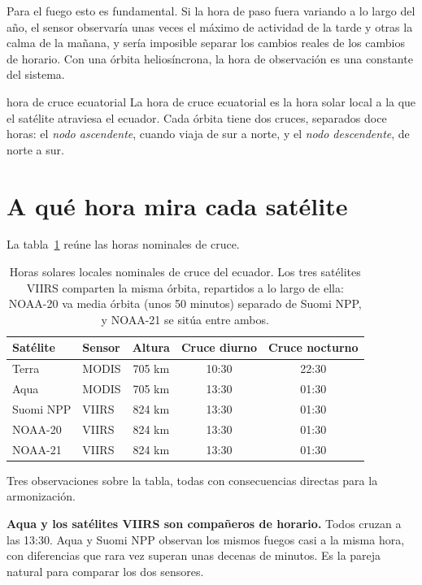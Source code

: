 Para el fuego esto es fundamental. Si la hora de paso fuera variando a lo largo del año, el
sensor observaría unas veces el máximo de actividad de la tarde y otras la calma de la mañana, y
sería imposible separar los cambios reales de los cambios de horario. Con una órbita
heliosíncrona, la hora de observación es una constante del sistema.

\begin{definicion}{hora de cruce ecuatorial}
La hora de cruce ecuatorial es la hora solar local a la que el satélite atraviesa el ecuador.
Cada órbita tiene dos cruces, separados doce horas: el \emph{nodo ascendente}, cuando viaja de
sur a norte, y el \emph{nodo descendente}, de norte a sur.
\end{definicion}

\section{A qué hora mira cada satélite}

La tabla~\ref{tab:horas} reúne las horas nominales de cruce.

\begin{table}[ht]
\centering
\begin{tabular}{llccc}
\toprule
Satélite & Sensor & Altura & Cruce diurno & Cruce nocturno \\
\midrule
Terra & MODIS & 705 km & 10:30 & 22:30 \\
Aqua & MODIS & 705 km & 13:30 & 01:30 \\
Suomi NPP & VIIRS & 824 km & 13:30 & 01:30 \\
NOAA-20 & VIIRS & 824 km & 13:30 & 01:30 \\
NOAA-21 & VIIRS & 824 km & 13:30 & 01:30 \\
\bottomrule
\end{tabular}
\caption{Horas solares locales nominales de cruce del ecuador. Los tres satélites VIIRS
comparten la misma órbita, repartidos a lo largo de ella: NOAA-20 va media órbita (unos 50
minutos) separado de Suomi NPP, y NOAA-21 se sitúa entre ambos.}
\label{tab:horas}
\end{table}

Tres observaciones sobre la tabla, todas con consecuencias directas para la armonización.

\textbf{Aqua y los satélites VIIRS son compañeros de horario.} Todos cruzan a las 13:30. Aqua y
Suomi NPP observan los mismos fuegos casi a la misma hora, con diferencias que rara vez superan
unas decenas de minutos. Es la pareja natural para comparar los dos sensores.

